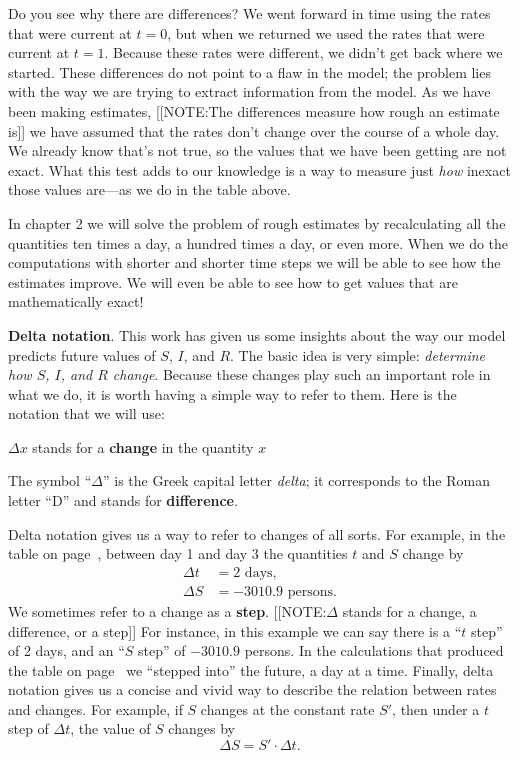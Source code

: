 Do you see why there are differences?  We went forward in time using
the rates that were current at $t = 0$, but when we returned we used
the rates that were current at $t = 1$.  Because these rates were
different, we didn't get back where we started.  These differences do
not point to a flaw in the model; the problem lies with the way we are
trying to extract information from the model.  As we have been making
estimates,
[[NOTE:The differences measure how rough an estimate is]]
we have assumed that the rates don't change over the course of a whole
day.  We already know that's not true, so the values that we have been
getting are not exact.  What this test adds to our knowledge is a way
to measure just {\em how\/} inexact those values are---as we do in the
table above.

\enlargethispage*{10pt}
In chapter 2 we will solve the problem of rough estimates by
recalculating all the quantities ten times a day, a hundred times a
day, or even more.  When we do the computations with shorter and
shorter time steps we will be able to see how the estimates improve.
We will even be able to see how to get values that are mathematically
exact!\label{`analyzeend'}






{\bf Delta notation}. This work has given us
some insights about the way our model predicts future values of $S$,
$I$, and $R$.  The basic idea is very simple: {\em determine how $S$,
  $I$, and $R$ change}.  Because these changes play such an important
role in what we do, it is worth having a simple way to refer to them.
Here is the notation that we will use:
\begin{center}
$\Delta x$ stands for a {\bf change} in the quantity $x$ 
\end{center}
The symbol ``$\Delta$'' is the Greek capital letter {\em delta\/}; it
corresponds to the Roman letter ``D'' and stands for {\bf difference}.

Delta notation gives us a way to refer to changes of all sorts.  For
example, in the table on page~\pageref{`threeday'}, between day 1 and
day 3 the quantities $t$ and $S$ change by
\begin{align*}
	\Delta t &= 2 \text{ days},	\\
	\Delta S &=  -3010.9 \text{ persons}.
\end{align*}
We sometimes refer to a change as a {\bf step}.  
[[NOTE:$\Delta$ stands for a change, a difference, or a step]]
For instance, in this example we can say there is a ``$t$ step'' of 2
days, and an ``$S$ step'' of $-3010.9$ persons.  In the calculations
that produced the table on page~\pageref{`threeday'} we ``stepped
into'' the future, a day at a time.  Finally, delta notation gives us
a concise and vivid way to describe the relation between rates and
changes.  For example, if $S$ changes at the constant rate $S'$, then
under a $t$ step of $\Delta t$, the value of $S$ changes by
\[
\Delta S = S' \cdot \Delta t.
\]




